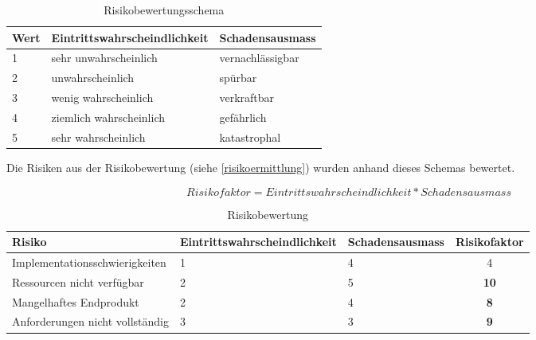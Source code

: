 \begin{table}[ht]
\centering
  \begin{tabular}{ l | p{5cm} | p{5cm} }
	\hline
	\rowcolor{gray}
	Wert							&	Eintrittswahrscheindlichkeit	&	Schadensausmass	\\ \hline			
	1							&	sehr unwahrscheinlich		&	vernachlässigbar	\\ \hline
	2							&	unwahrscheinlich			&	spürbar		\\ \hline
	3							&	wenig wahrscheinlich		&	verkraftbar		\\ \hline
	4							&	ziemlich wahrscheinlich		&	gefährlich		\\ \hline
	5							&	sehr wahrscheinlich			&	katastrophal		\\ \hline
  \end{tabular}
   \caption{Risikobewertungsschema}
\end{table}

\FloatBarrier
Die Risiken aus der Risikobewertung (siehe \ref{risikoermittlung}) wurden anhand dieses Schemas bewertet.

\begin{equation*}
Risikofaktor = Eintrittswahrscheindlichkeit * Schadensausmass
\end{equation*}

\begin{table}[ht]
\centering
  \begin{tabular}{ l | p{4cm} | p{3cm} | c }
	\hline
	\rowcolor{gray}
	Risiko							&	Eintrittswahrscheindlichkeit	&	Schadensausmass 	&	Risikofaktor\\ \hline			
	Implementationsschwierigkeiten			&	1					&	4			&	4		\\ \hline
	Ressourcen nicht verfügbar			&	2					&	5			&	\textbf{10}	\\ \hline
	Mangelhaftes Endprodukt				&	2					&	4			&	\textbf{8}	\\ \hline
	Anforderungen nicht vollständig			&	3					&	3			&	\textbf{9}	\\ \hline
  \end{tabular}
   \caption{Risikobewertung}
\end{table}

